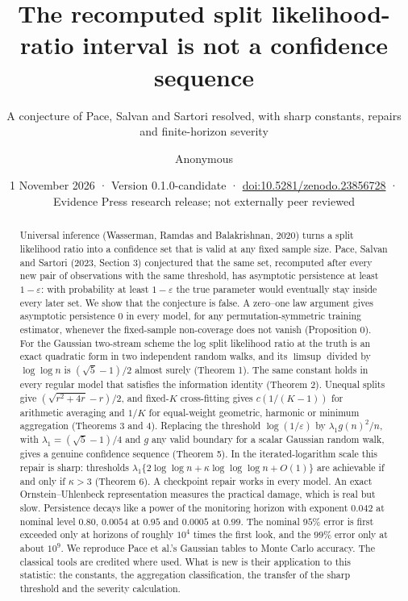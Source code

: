 \documentclass[
  10pt,
  a4paper,
]{article}
\title{The recomputed split likelihood-ratio interval is not a
confidence sequence}
\subtitle{A conjecture of Pace, Salvan and Sartori resolved, with sharp
constants, repairs and finite-horizon severity}
\author{Anonymous}
\date{1 November 2026 · Version 0.1.0-candidate ·
\href{https://doi.org/10.5281/zenodo.23856728}{doi:10.5281/zenodo.23856728}
· Evidence Press research release; not externally peer reviewed}
\begin{document}
\maketitle
\begin{abstract}
Universal inference (Wasserman, Ramdas and Balakrishnan, 2020) turns a
split likelihood ratio into a confidence set that is valid at any fixed
sample size. Pace, Salvan and Sartori (2023, Section 3) conjectured that
the same set, recomputed after every new pair of observations with the
same threshold, has asymptotic persistence at least \(1-\varepsilon\):
with probability at least \(1-\varepsilon\) the true parameter would
eventually stay inside every later set. We show that the conjecture is
false. A zero--one law argument gives asymptotic persistence \(0\) in
every model, for any permutation-symmetric training estimator, whenever
the fixed-sample non-coverage does not vanish (Proposition 0). For the
Gaussian two-stream scheme the log split likelihood ratio at the truth
is an exact quadratic form in two independent random walks, and its
\(\limsup\) divided by \(\log\log n\) is \((\sqrt5-1)/2\) almost surely
(Theorem 1). The same constant holds in every regular model that
satisfies the information identity (Theorem 2). Unequal splits give
\((\sqrt{r^2+4r}-r)/2\), and fixed-\(K\) cross-fitting gives
\(c(1/(K-1))\) for arithmetic averaging and \(1/K\) for equal-weight
geometric, harmonic or minimum aggregation (Theorems 3 and 4). Replacing
the threshold \(\log(1/\varepsilon)\) by \(\lambda_1g(n)^2/n\), with
\(\lambda_1=(\sqrt5-1)/4\) and \(g\) any valid boundary for a scalar
Gaussian random walk, gives a genuine confidence sequence (Theorem 5).
In the iterated-logarithm scale this repair is sharp: thresholds
\(\lambda_1\{2\log\log n+\kappa\log\log\log n+O(1)\}\) are achievable if
and only if \(\kappa>3\) (Theorem 6). A checkpoint repair works in every
model. An exact Ornstein--Uhlenbeck representation measures the
practical damage, which is real but slow. Persistence decays like a
power of the monitoring horizon with exponent \(0.042\) at nominal level
\(0.80\), \(0.0054\) at \(0.95\) and \(0.0005\) at \(0.99\). The nominal
\(95\%\) error is first exceeded only at horizons of roughly \(10^4\)
times the first look, and the \(99\%\) error only at about \(10^{9}\).
We reproduce Pace et al.'s Gaussian tables to Monte Carlo accuracy. The
classical tools are credited where used. What is new is their
application to this statistic: the constants, the aggregation
classification, the transfer of the sharp threshold and the severity
calculation.
\end{abstract}
\end{document}
